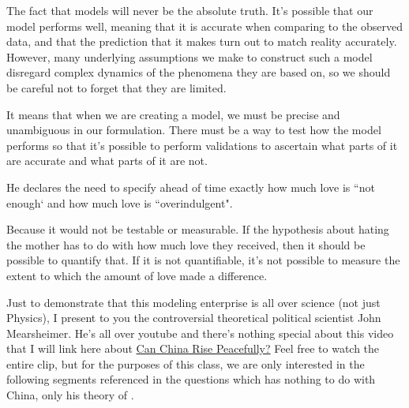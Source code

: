 \documentclass[12pt]{article}
\begin{document}
\begin{enumerate}
The fact that models will never be the absolute truth. It's possible that our model performs well,
meaning that it is accurate when comparing to the observed data, and that the prediction that
it makes turn out to match reality accurately. However, many underlying assumptions we make to
construct such a model disregard complex dynamics of the phenomena they are based on, so
we should be careful not to forget that they are limited.

 

It means that when we are creating a model, we must be precise and unambiguous in our formulation.
There must be a way to test how the model performs so that it's possible to perform validations
to ascertain what parts of it are accurate and what parts of it are not.

 

He declares the need to specify ahead of time exactly how much love is ``not enough` and how much love is
``overindulgent".

 

Because it would not be testable or measurable. If the hypothesis about hating the mother
has to do with how much love they received, then it should be possible to quantify that.
If it is not quantifiable, it's not possible to measure the extent to which the amount of love
made a difference.


Just to demonstrate that this modeling enterprise is all over science (not just Physics), I present to you the controversial theoretical political scientist John Mearsheimer. He's all over youtube and there's nothing special about this video that I will link here about \href{https://www.youtube.com/watch?v=D_Mx_e8t7nU&t=4673s}{Can China Rise Peacefully?} Feel free to watch the entire clip, but for the purposes of this class, we are only interested in the following segments referenced in the questions which has nothing to do with China, only his theory of .

 


\end{enumerate}
\end{document}
